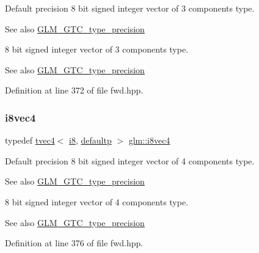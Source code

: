 Default precision 8 bit signed integer vector of 3 components type. \begin{DoxySeeAlso}{See also}
\mbox{\hyperlink{group__gtc__type__precision}{G\+L\+M\+\_\+\+G\+T\+C\+\_\+type\+\_\+precision}}
\end{DoxySeeAlso}
8 bit signed integer vector of 3 components type. \begin{DoxySeeAlso}{See also}
\mbox{\hyperlink{group__gtc__type__precision}{G\+L\+M\+\_\+\+G\+T\+C\+\_\+type\+\_\+precision}} 
\end{DoxySeeAlso}


Definition at line 372 of file fwd.\+hpp.

\mbox{\label{group__gtc__type__precision_gafbf10a778016eba57d44beb585f2dc49}} 
\subsubsection{\texorpdfstring{i8vec4}{i8vec4}}
{\footnotesize\ttfamily typedef \mbox{\hyperlink{structglm_1_1tvec4}{tvec4}}$<$ \mbox{\hyperlink{group__gtc__type__precision_gaae064be68b7d36cd7910c16e8ad18bba}{i8}}, \mbox{\hyperlink{namespaceglm_a0f04f086094c747d227af4425893f545a9d21ccd8b5a009ec7eb7677befc3bf51}{defaultp}} $>$ \mbox{\hyperlink{group__gtc__type__precision_gafbf10a778016eba57d44beb585f2dc49}{glm\+::i8vec4}}}

Default precision 8 bit signed integer vector of 4 components type. \begin{DoxySeeAlso}{See also}
\mbox{\hyperlink{group__gtc__type__precision}{G\+L\+M\+\_\+\+G\+T\+C\+\_\+type\+\_\+precision}}
\end{DoxySeeAlso}
8 bit signed integer vector of 4 components type. \begin{DoxySeeAlso}{See also}
\mbox{\hyperlink{group__gtc__type__precision}{G\+L\+M\+\_\+\+G\+T\+C\+\_\+type\+\_\+precision}} 
\end{DoxySeeAlso}


Definition at line 376 of file fwd.\+hpp.

\mbox{\label{group__gtc__type__precision_ga2945a61d12771f8954994fcddf02b021}} 
